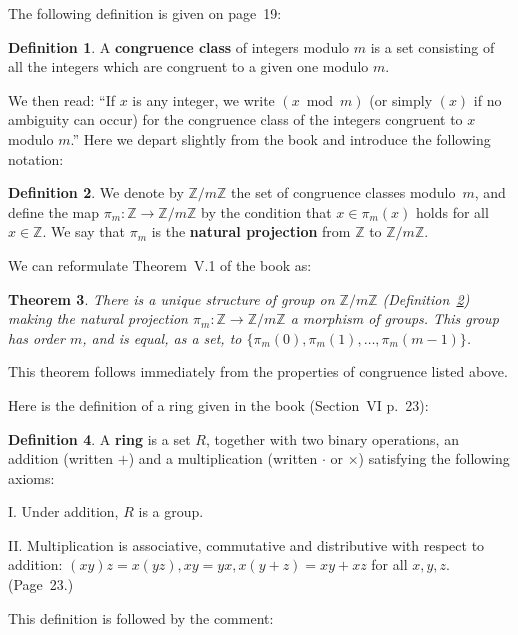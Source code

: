 \documentclass[12pt,letterpaper]{article}
\newcommand{\Z}{\mathbb{Z}}
\newcommand{\Zm}[1]{\Z/#1\Z}
\newtheorem{thm}{Theorem}%
\theoremstyle{definition}
\newtheorem{defn}[thm]{Definition}
\begin{document}
The following definition is given on page~19: 

\begin{defn}\label{Dclass}
A \textbf{congruence class}  of integers modulo $m$ is a set consisting of all the integers which are congruent to a given one modulo $m$. 
\end{defn}

We then read: ``If $x$ is any integer, we write $(x \bmod m)$ (or simply $(x)$ if no ambiguity can occur) for the congruence class of the integers congruent to $x$ modulo $m$.'' Here we depart slightly from the book and introduce the following notation: 

\begin{defn}\label{Dpim}
We denote by $\Zm{m}$ \index{Z@$\Zm{m}$} the set of congruence classes  modulo~$m$, and define the map $\pi_m:\Z\to\Zm{m}$  by the condition that $x\in\pi_m(x)$ holds for all $x\in\Z$. We say that $\pi_m$ is the \textbf{natural projection}  from $\Z$ to $\Zm{m}$. 
\end{defn}

We can reformulate Theorem~V.1 of the book as: 

\begin{thm}\label{Tconggpmor}
There is a unique structure of group on $\Zm{m}$ (Definition~\ref{Dpim}) making the natural projection $\pi_m:\Z\to\Zm{m}$ a morphism of groups. This group has order $m$, and is equal, as a set, to $\{\pi_m(0), \pi_m(1), \ldots, \pi_m(m-1)\}$. 
\end{thm}

This theorem follows immediately from the properties of congruence listed above. 

Here is the definition of a ring given in the book (Section~VI p.~23):

\begin{defn}\label{Dring}
A \textbf{ring}  is a set $R$, together with two binary operations, an addition (written $+$) and a multiplication (written $\cdot$ or $\times$) satisfying the following axioms:

I. Under addition, $R$ is a group.

II. Multiplication is associative, commutative and distributive with respect to addition: $(xy)z=x(yz), xy=yx,
x(y+z)=xy+xz$ for all $x,y,z$. (Page~23.) 
\end{defn}

This definition is followed by the comment: 
\end{document}
